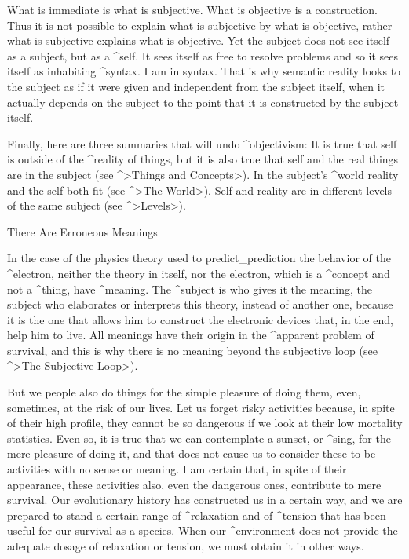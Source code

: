 What is immediate is what is subjective. What is objective is a
construction. Thus it is not possible to explain what is subjective by
what is objective, rather what is subjective explains what is objective.
Yet the subject does not see itself as a subject, but as a ^{self}. It
sees itself as free to resolve problems and so it sees itself as
inhabiting ^{syntax}. I am in syntax. That is why semantic reality looks
to the subject as if it were given and independent from the subject
itself, when it actually depends on the subject to the point that it is
constructed by the subject itself.

Finally, here are three summaries that will undo ^{objectivism}:
\beginpoints
\point It is true that self is outside of the ^{reality} of things, but
it is also true that self and the real things are in the subject (see
^>Things and Concepts>).
\point In the subject's ^{world} reality and the self both fit (see
^>The World>).
\point Self and reality are in different levels of the same subject
(see ^>Levels>).
\endpoints


\Section There Are Erroneous Meanings

In the case of the physics theory used to predict_{prediction} the
behavior of the ^{electron}, neither the theory in itself, nor the
electron, which is a ^{concept} and not a ^{thing}, have ^{meaning}. The
^{subject} is who gives it the meaning, the subject who elaborates or
interprets this theory, instead of another one, because it is the one
that allows him to construct the electronic devices that, in the end,
help him to live. All meanings have their origin in the ^{apparent
problem} of survival, and this is why there is no meaning beyond the
subjective loop (see ^>The Subjective Loop>).

But we people also do things for the simple pleasure of doing them,
even, sometimes, at the risk of our lives. Let us forget risky
activities because, in spite of their high profile, they cannot be so
dangerous if we look at their low mortality statistics. Even so, it is
true that we can contemplate a sunset, or ^{sing}, for the mere pleasure
of doing it, and that does not cause us to consider these to be
activities with no sense or meaning. I am certain that, in spite of
their appearance, these activities also, even the dangerous ones,
contribute to mere survival. Our evolutionary history has constructed us
in a certain way, and we are prepared to stand a certain range of
^{relaxation} and of ^{tension} that has been useful for our survival as
a species. When our ^{environment} does not provide the adequate dosage
of relaxation or tension, we must obtain it in other ways.

